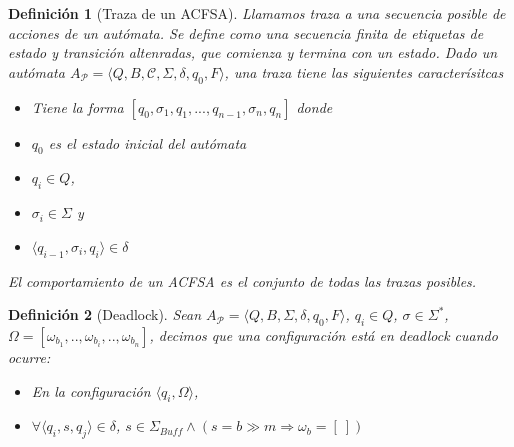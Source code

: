 \documentclass[paper=a4, fontsize=11pt, spanish]{scrartcl} %
\numberwithin{equation}{section} %
\numberwithin{figure}{section} %
\numberwithin{table}{section} %
\newtheorem{definition}{Definición}
\begin{document}
\begin{definition}[Traza de un ACFSA] Llamamos traza a una secuencia posible de acciones de un autómata. Se define como una secuencia finita de etiquetas de estado y transición altenradas, que comienza y termina con un estado. Dado un autómata $A_\mathcal{P} = \langle Q, B, \mathcal{C}, \Sigma, \delta, q_0, F\rangle$, una traza tiene las siguientes caracterísitcas

\begin{itemize}
\item Tiene la forma $[q_0, \sigma_1, q_1,...,q_{n-1}, \sigma_n, q_n] $ donde 
\item $q_0$ es el estado inicial del autómata
\item $q_i \in Q$,
\item $ \sigma_i \in \Sigma$ y
\item $\langle q_{i-1}, \sigma_i, q_i \rangle \in \delta $ 
\end{itemize}

El comportamiento de un ACFSA es el conjunto de todas las trazas posibles.
\end{definition}








\begin{definition}[Deadlock]Sean $A_\mathcal{P} = \langle Q, B, \Sigma, \delta, q_0, F\rangle$, $q_{i} \in Q$, $\sigma \in \Sigma^*$,  $\Omega = [ \omega_{b_1},..,\omega_{b_i},..,\omega_{b_n} ]$, decimos que una configuración está en deadlock cuando ocurre:
\begin{itemize}
\item En la configuración $\langle q_i, \Omega \rangle$,

\item $ \forall \langle q_i, s, q_j \rangle \in \delta$, $s \in \Sigma_\mathit{Buff} \land (s= b \gg m \Rightarrow \omega_b = [\ ])$
\end{itemize}
\end{definition}
\end{document}
